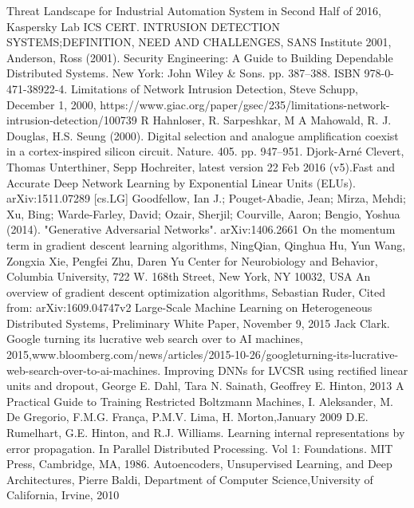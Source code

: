 \documentclass[12pt, a4paper]{report}
\begin{document}
\begin{thebibliography}{9}
Threat Landscape for Industrial Automation System in Second Half of 2016, Kaspersky Lab ICS CERT.
INTRUSION DETECTION SYSTEMS;DEFINITION, NEED AND CHALLENGES, SANS Institute 2001,
Anderson, Ross (2001). Security Engineering: A Guide to Building Dependable Distributed Systems. New York: John Wiley \& Sons. pp. 387–388. ISBN 978-0-471-38922-4.
Limitations of Network Intrusion Detection, Steve Schupp, December 1, 2000, https://www.giac.org/paper/gsec/235/limitations-network-intrusion-detection/100739
R Hahnloser, R. Sarpeshkar, M A Mahowald, R. J. Douglas, H.S. Seung (2000). Digital selection and analogue amplification coexist in a cortex-inspired silicon circuit. Nature. 405. pp. 947–951.
Djork-Arné Clevert, Thomas Unterthiner, Sepp Hochreiter, latest version 22 Feb 2016 (v5).Fast and Accurate Deep Network Learning by Exponential Linear Units (ELUs). arXiv:1511.07289 [cs.LG]
Goodfellow, Ian J.; Pouget-Abadie, Jean; Mirza, Mehdi; Xu, Bing; Warde-Farley, David; Ozair, Sherjil; Courville, Aaron; Bengio, Yoshua (2014). "Generative Adversarial Networks". arXiv:1406.2661
On the momentum term in gradient descent learning algorithms, NingQian, Qinghua Hu, Yun Wang, Zongxia Xie, Pengfei Zhu, Daren Yu
Center for Neurobiology and Behavior, Columbia University, 722 W. 168th Street, New York, NY 10032, USA
An overview of gradient descent optimization algorithms, Sebastian Ruder, Cited from: arXiv:1609.04747v2  
Large-Scale Machine Learning on Heterogeneous Distributed Systems, Preliminary White Paper, November 9, 2015
Jack Clark. Google turning its lucrative web search over to AI machines, 2015,www.bloomberg.com/news/articles/2015-10-26/googleturning-its-lucrative-web-search-over-to-ai-machines.
 Improving DNNs for LVCSR using rectified linear units and dropout, George E. Dahl, Tara N. Sainath, Geoffrey E. Hinton, 2013
 A Practical Guide to Training Restricted Boltzmann Machines, I. Aleksander, M. De Gregorio, F.M.G. França, P.M.V. Lima, H. Morton,January 2009
D.E. Rumelhart, G.E. Hinton, and R.J. Williams. Learning internal representations by error propagation. In Parallel Distributed Processing. Vol 1: Foundations. MIT Press, Cambridge, MA, 1986.
Autoencoders, Unsupervised Learning, and Deep Architectures, Pierre Baldi, Department of Computer Science,University of California, Irvine, 2010

\end{thebibliography}
\end{document}
